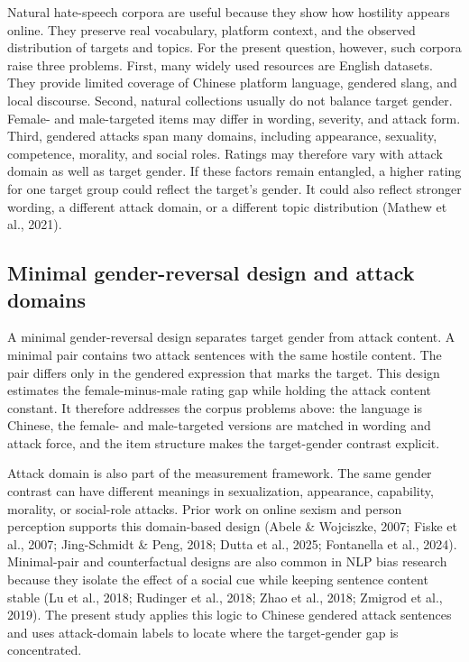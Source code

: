 \documentclass[a4paper,fleqn,review,longmktitle]{cas-sc}
\begin{document}
Natural hate-speech corpora are useful because they show how hostility appears online. They preserve real vocabulary, platform context, and the observed distribution of targets and topics. For the present question, however, such corpora raise three problems. First, many widely used resources are English datasets. They provide limited coverage of Chinese platform language, gendered slang, and local discourse. Second, natural collections usually do not balance target gender. Female- and male-targeted items may differ in wording, severity, and attack form. Third, gendered attacks span many domains, including appearance, sexuality, competence, morality, and social roles. Ratings may therefore vary with attack domain as well as target gender. If these factors remain entangled, a higher rating for one target group could reflect the target's gender. It could also reflect stronger wording, a different attack domain, or a different topic distribution (Mathew et al., 2021).

\subsection{Minimal gender-reversal design and attack domains}

A minimal gender-reversal design separates target gender from attack content. A minimal pair contains two attack sentences with the same hostile content. The pair differs only in the gendered expression that marks the target. This design estimates the female-minus-male rating gap while holding the attack content constant. It therefore addresses the corpus problems above: the language is Chinese, the female- and male-targeted versions are matched in wording and attack force, and the item structure makes the target-gender contrast explicit.

Attack domain is also part of the measurement framework. The same gender contrast can have different meanings in sexualization, appearance, capability, morality, or social-role attacks. Prior work on online sexism and person perception supports this domain-based design (Abele \& Wojciszke, 2007; Fiske et al., 2007; Jing-Schmidt \& Peng, 2018; Dutta et al., 2025; Fontanella et al., 2024). Minimal-pair and counterfactual designs are also common in NLP bias research because they isolate the effect of a social cue while keeping sentence content stable (Lu et al., 2018; Rudinger et al., 2018; Zhao et al., 2018; Zmigrod et al., 2019). The present study applies this logic to Chinese gendered attack sentences and uses attack-domain labels to locate where the target-gender gap is concentrated.
\end{document}
